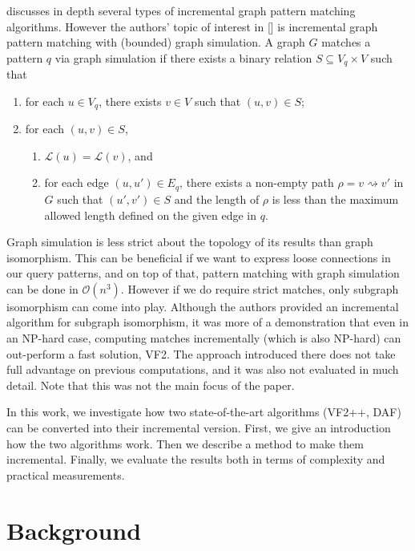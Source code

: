\cite{incrementalpatternmatching} discusses in depth several types of incremental graph pattern matching algorithms.
However the authors' topic of interest in [] is incremental graph pattern matching
with (bounded) graph simulation. A graph \(G\) matches a pattern \(q\) via graph 
simulation if there exists a binary relation \(S \subseteq V_q \times V\) such that 
\begin{enumerate}
    \item for each \(u \in V_q\), there exists \(v \in V\) such that \((u, v) \in S\);
    \item for each \((u, v) \in S\), 
        \begin{enumerate}
            \item \(\mathcal{L}(u) = \mathcal{L}(v)\), and
            \item for each edge \((u, u') \in E_q\), there exists a non-empty path \(\rho = v \rightsquigarrow v'\) in \(G\) such that \((u', v') \in S\) and the length of \(\rho\) is less than the maximum allowed length defined on the given edge in \(q\).
        \end{enumerate}
\end{enumerate}
Graph simulation is less strict about the topology of its results than graph
isomorphism. This can be beneficial if we want to express loose connections in
our query patterns, and on top of that, pattern matching with graph simulation
can be done in \(\mathcal{O}(n^3)\). However if we do require strict matches,
only subgraph isomorphism can come into play. Although the authors provided an
incremental algorithm for subgraph isomorphism, it was more of a demonstration
that even in an NP-hard case, computing matches incrementally (which is also
NP-hard) can out-perform a fast solution, VF2. The approach introduced there
does not take full advantage on previous computations, and it was also not 
evaluated in much detail. Note that this was not the main focus of the paper.

In this work, we investigate how two state-of-the-art algorithms (VF2++, DAF)
can be converted into their incremental version. First, we give an introduction
how the two algorithms work. Then we describe a method to make them incremental.
Finally, we evaluate the results both in terms of complexity and practical
measurements.

\section{Background}

